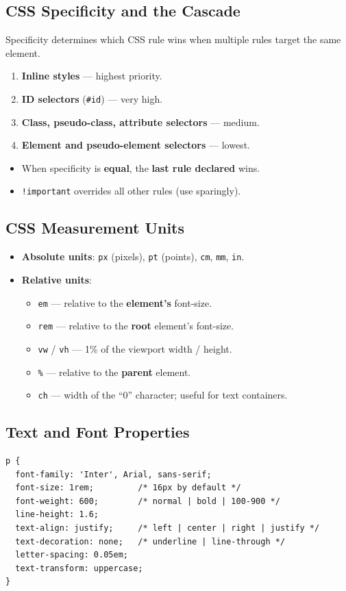 \documentclass[hidelinks]{article}
\begin{document}
\subsection{CSS Specificity and the Cascade}
Specificity determines which CSS rule wins when multiple rules target the same element.
\begin{enumerate}
  \item \textbf{Inline styles} --- highest priority.
  \item \textbf{ID selectors} (\texttt{\#id}) --- very high.
  \item \textbf{Class, pseudo-class, attribute selectors} --- medium.
  \item \textbf{Element and pseudo-element selectors} --- lowest.
\end{enumerate}
\begin{itemize}
  \item When specificity is \textbf{equal}, the \textbf{last rule declared} wins.
  \item \texttt{!important} overrides all other rules (use sparingly).
\end{itemize}

\subsection{CSS Measurement Units}
\begin{itemize}
  \item \textbf{Absolute units}: \texttt{px} (pixels), \texttt{pt} (points), \texttt{cm}, \texttt{mm}, \texttt{in}.
  \item \textbf{Relative units}:
    \begin{itemize}
      \item \texttt{em} --- relative to the \textbf{element's} font-size.
      \item \texttt{rem} --- relative to the \textbf{root} element's font-size.
      \item \texttt{vw} / \texttt{vh} --- 1\% of the viewport width / height.
      \item \texttt{\%} --- relative to the \textbf{parent} element.
      \item \texttt{ch} --- width of the ``0'' character; useful for text containers.
    \end{itemize}
\end{itemize}

\subsection{Text and Font Properties}
\begin{lstlisting}[language={}, caption={Common text properties}]
p {
  font-family: 'Inter', Arial, sans-serif;
  font-size: 1rem;         /* 16px by default */
  font-weight: 600;        /* normal | bold | 100-900 */
  line-height: 1.6;
  text-align: justify;     /* left | center | right | justify */
  text-decoration: none;   /* underline | line-through */
  letter-spacing: 0.05em;
  text-transform: uppercase;
}
\end{lstlisting}
\end{document}
